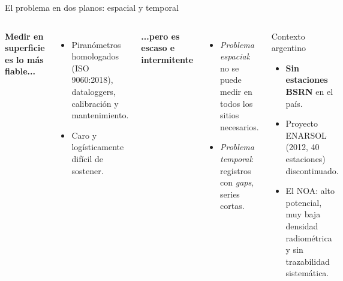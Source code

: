 \documentclass[aspectratio=169,11pt]{beamer}
\begin{document}
\begin{frame}{El problema en dos planos: espacial y temporal}
  \footnotesize
  \begin{columns}[T]
    \textbf{\color{primary}Medir en superficie es lo más fiable...}
    \begin{itemize}
      \item Piranómetros homologados (ISO 9060:2018), dataloggers, calibración y mantenimiento.
      \item Caro y logísticamente difícil de sostener.
    \end{itemize}
    \textbf{\color{primary}...pero es escaso e intermitente}
    \begin{itemize}
      \item \emph{Problema espacial}: no se puede medir en todos los sitios necesarios.
      \item \emph{Problema temporal}: registros con \emph{gaps}, series cortas.
    \end{itemize}
    \begin{block}{Contexto argentino}
      \scriptsize
      \begin{itemize}
        \item \textbf{Sin estaciones BSRN} en el país.
        \item Proyecto ENARSOL (2012, 40 estaciones) discontinuado.
        \item El NOA: alto potencial, muy baja densidad radiométrica y sin trazabilidad sistemática.
      \end{itemize}
    \end{block}
  \end{columns}
\end{frame}
\end{document}
